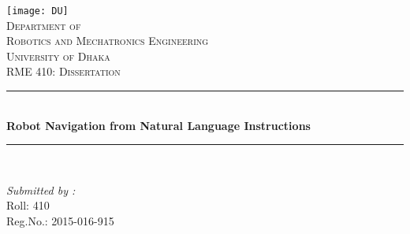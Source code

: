\begin{titlepage}
		\newcommand{\HRule}{\rule{\linewidth}{0.1mm}}
		\centering %
		
		\centering
		\texttt{[image: DU]}\\
		\textsc{\Large Department of\\ Robotics and Mechatronics Engineering}\\[0.5cm]
		\textsc{\LARGE University of Dhaka}\\[1.cm]
		
		\textsc{\Large RME 410: Dissertation}\\[0.5cm] %
		
		\HRule \\[.5cm]
		{ \LARGE \bfseries Robot Navigation from Natural Language Instructions}\\[0.1cm] %
		\HRule \\[1.5cm]
		
		
		\begin{minipage}{0.4\textwidth}
            \begin{flushleft} \large
                
                \emph{Submitted by :}\\
   
                Roll: 410\\
                Reg.No.: 2015-016-915
                
            \end{flushleft}
            

\end{minipage}
\end{titlepage}
